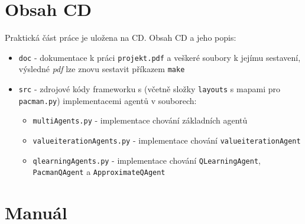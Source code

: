 \chapter{Obsah CD}
Praktická část práce je uložena na CD. Obsah CD a jeho popis:
\begin{itemize}
\item \texttt{doc} - dokumentace k práci \texttt{projekt.pdf} a veškeré soubory k jejímu sestavení, výsledné \textit{pdf} lze znovu sestavit příkazem \texttt{make}
\item \texttt{src} - zdrojové kódy frameworku s (včetně složky \texttt{layouts} s mapami pro \texttt{pacman.py}) implementacemi agentů v souborech:
\begin{itemize}
\item \texttt{multiAgents.py} - implementace chování základních agentů
\item \texttt{valueiterationAgents.py} - implementace chování \texttt{valueiterationAgent}
\item \texttt{qlearningAgents.py} - implementace chování \texttt{QLearningAgent}, \texttt{PacmanQAgent} a \texttt{ApproximateQAgent}
\end{itemize}
\end{itemize}

\chapter{Manuál}
\label{priloha:manual}
